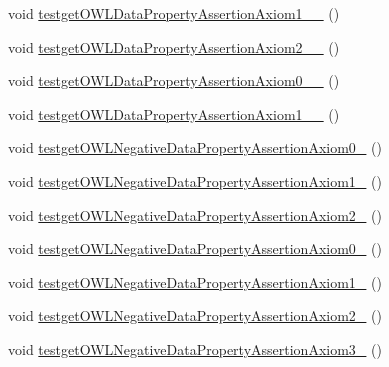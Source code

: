 \begin{DoxyCompactItemize}
\item 
void \hyperlink{classorg_1_1semanticweb_1_1owlapi_1_1api_1_1test_1_1_null_check_test_case_af4f7c5bc47699dc6d0aa039c4a689f8e}{testget\-O\-W\-L\-Data\-Property\-Assertion\-Axiom1\-\_\-\_} ()
\item 
void \hyperlink{classorg_1_1semanticweb_1_1owlapi_1_1api_1_1test_1_1_null_check_test_case_a7b497140a0304d3fa31094d4282eee07}{testget\-O\-W\-L\-Data\-Property\-Assertion\-Axiom2\-\_\-\_} ()
\item 
void \hyperlink{classorg_1_1semanticweb_1_1owlapi_1_1api_1_1test_1_1_null_check_test_case_a2e7b005527926006482de94955465c62}{testget\-O\-W\-L\-Data\-Property\-Assertion\-Axiom0\-\_\-\_} ()
\item 
void \hyperlink{classorg_1_1semanticweb_1_1owlapi_1_1api_1_1test_1_1_null_check_test_case_a05bb1a63801f3153bf0d202b7172991e}{testget\-O\-W\-L\-Data\-Property\-Assertion\-Axiom1\-\_\-\_} ()
\item 
void \hyperlink{classorg_1_1semanticweb_1_1owlapi_1_1api_1_1test_1_1_null_check_test_case_ab7c056c7c59728e03a4e361decec3512}{testget\-O\-W\-L\-Negative\-Data\-Property\-Assertion\-Axiom0\-\_} ()
\item 
void \hyperlink{classorg_1_1semanticweb_1_1owlapi_1_1api_1_1test_1_1_null_check_test_case_a42c8b73e7f171eb196810bf8b9accc97}{testget\-O\-W\-L\-Negative\-Data\-Property\-Assertion\-Axiom1\-\_} ()
\item 
void \hyperlink{classorg_1_1semanticweb_1_1owlapi_1_1api_1_1test_1_1_null_check_test_case_a449c21ae2647ef12f26a08d47c8d5f3b}{testget\-O\-W\-L\-Negative\-Data\-Property\-Assertion\-Axiom2\-\_} ()
\item 
void \hyperlink{classorg_1_1semanticweb_1_1owlapi_1_1api_1_1test_1_1_null_check_test_case_a8cb7fa9e957fee8e0a5c3274f421d51e}{testget\-O\-W\-L\-Negative\-Data\-Property\-Assertion\-Axiom0\-\_} ()
\item 
void \hyperlink{classorg_1_1semanticweb_1_1owlapi_1_1api_1_1test_1_1_null_check_test_case_a2c02a73212b6e6eb931d55c7560ffabf}{testget\-O\-W\-L\-Negative\-Data\-Property\-Assertion\-Axiom1\-\_} ()
\item 
void \hyperlink{classorg_1_1semanticweb_1_1owlapi_1_1api_1_1test_1_1_null_check_test_case_a652fdc8b84ed9c2255b6c5e7e8c9e084}{testget\-O\-W\-L\-Negative\-Data\-Property\-Assertion\-Axiom2\-\_} ()
\item 
void \hyperlink{classorg_1_1semanticweb_1_1owlapi_1_1api_1_1test_1_1_null_check_test_case_a5395bcd7d6794ab020f009c47190d9a9}{testget\-O\-W\-L\-Negative\-Data\-Property\-Assertion\-Axiom3\-\_} ()

\end{DoxyCompactItemize}
